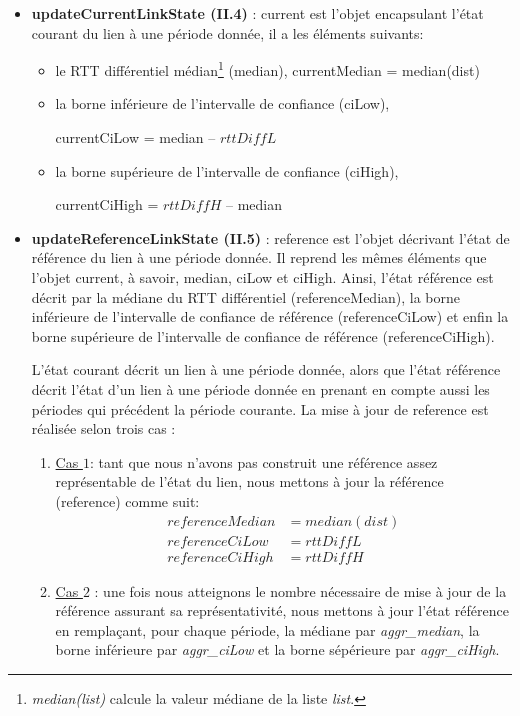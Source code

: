 \begin{itemize}
	
	\item \textbf{updateCurrentLinkState (II.4)} :  {\color{gray}current}  est l'objet encapsulant  l'état courant du lien à une période donnée, il a
	les éléments suivants:
	
	\begin{itemize}[label=$\square$]
		\item le RTT différentiel médian\footnote{\textit{median(list)} calcule la valeur médiane de la liste \textit{list}. } ({\color{gray}median}),
		{\color{gray}currentMedian} = median(dist) 
		
		\item  la borne inférieure de l'intervalle de confiance ({\color{gray}ciLow}),
		
		{\color{gray}currentCiLow} = {\color{gray}median} --  $ rttDiffL $
		
		\item   la borne supérieure de l'intervalle de confiance ({\color{gray}ciHigh}),
		
		{\color{gray}currentCiHigh} =  $ rttDiffH$ --  {\color{gray}median}
		
	\end{itemize}
	
	\item \textbf{ updateReferenceLinkState (II.5)} :  {\color{gray}reference}  est l'objet décrivant l'état de référence du lien à une période donnée. Il reprend les mêmes éléments que  l'objet {\color{gray}current}, à savoir, {\color{gray}median}, {\color{gray}ciLow} et {\color{gray}ciHigh}. Ainsi, l'état référence est décrit par la médiane du RTT différentiel ({\color{gray}referenceMedian}), la borne inférieure de l'intervalle de confiance de référence ({\color{gray}referenceCiLow}) et enfin la borne supérieure de l'intervalle de confiance de référence ({\color{gray}referenceCiHigh}).
	
	L'état courant décrit un lien à une période donnée, alors que l'état référence décrit l'état d'un lien à une période donnée en prenant en compte aussi les périodes qui précédent la période courante. La mise à jour de {\color{gray}reference}  est réalisée selon trois cas :
	
	\begin{enumerate}
		\item \underline{Cas $1$}: tant que nous n'avons pas construit une référence assez représentable de l'état du lien,  nous mettons à jour la référence ({\color{gray}reference}) comme suit: 
		\begin{align}
		referenceMedian &= median(dist)\\
		referenceCiLow &= rttDiffL\\
		referenceCiHigh& = rttDiffH
		\end{align}
		\item \underline{Cas $2$} : une fois nous atteignons le nombre nécessaire de  mise à jour de la référence assurant sa représentativité, nous mettons à jour l'état référence en remplaçant, pour chaque période, la médiane par \textit{ aggr\_median}, la borne inférieure  par  \textit{aggr\_ciLow} et la borne sépérieure par \textit{aggr\_ciHigh}.
		\begin{itemize}
			

\end{itemize}
\end{enumerate}
\end{itemize}
